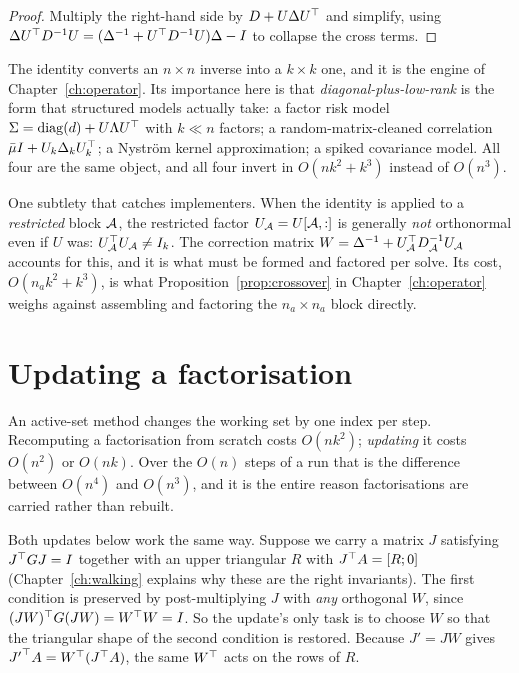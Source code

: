 \begin{proof}
Multiply the right-hand side by $D + U\Delta U^{\top}$ and simplify, using
$\Delta U^{\top} D^{-1}U = (\Delta^{-1} + U^{\top} D^{-1}U)\Delta - I$ to collapse the cross
terms.
\end{proof}

The identity converts an $n\times n$ inverse into a $k\times k$ one, and it is the
engine of Chapter~\ref{ch:operator}. Its importance here is that
\emph{diagonal-plus-low-rank} is the form that structured models actually take: a
factor risk model $\Sigma = \operatorname{diag}(d) + U\Lambda U^{\top}$ with $k \ll n$ factors; a
random-matrix-cleaned correlation $\bar\mu I + U_k\Delta_k U_k^{\top}$; a Nyström kernel
approximation; a spiked covariance model. All four are the same object, and all
four invert in $O(nk^2 + k^3)$ instead of $O(n^3)$.

One subtlety that catches implementers. When the identity is applied to a
\emph{restricted} block $\mathcal{A}$, the restricted factor $U_{\mathcal{A}} = U[\mathcal{A},:]$
is generally \emph{not} orthonormal even if $U$ was:
$U_{\mathcal{A}}^{\top} U_{\mathcal{A}} \ne I_k$. The correction matrix
$W = \Delta^{-1} + U_{\mathcal{A}}^{\top} D_{\mathcal{A}}^{-1} U_{\mathcal{A}}$ accounts for this, and it
is what must be formed and factored per solve. Its cost, $O(n_a k^2 + k^3)$, is
what Proposition~\ref{prop:crossover} in Chapter~\ref{ch:operator} weighs against
assembling and factoring the $n_a \times n_a$ block directly.

\section{Updating a factorisation}
\label{sec:updating}

An active-set method changes the working set by one index per step. Recomputing a
factorisation from scratch costs $O(nk^2)$; \emph{updating} it costs $O(n^2)$ or
$O(nk)$. Over the $O(n)$ steps of a run that is the difference between $O(n^4)$
and $O(n^3)$, and it is the entire reason factorisations are carried rather than
rebuilt.

Both updates below work the same way. Suppose we carry a matrix $J$ satisfying
$J^{\top} G J = I$ together with an upper triangular $R$ with $J^{\top} A = [R;0]$
(Chapter~\ref{ch:walking} explains why these are the right invariants). The first
condition is preserved by post-multiplying $J$ with \emph{any} orthogonal $W$,
since $(JW)^{\top} G (JW) = W^{\top} W = I$. So the update's only task is to choose $W$ so
that the triangular shape of the second condition is restored. Because
$J' = JW$ gives ${J'}^{\top} A = W^{\top}(J^{\top} A)$, the same $W^{\top}$ acts on the rows of $R$.

